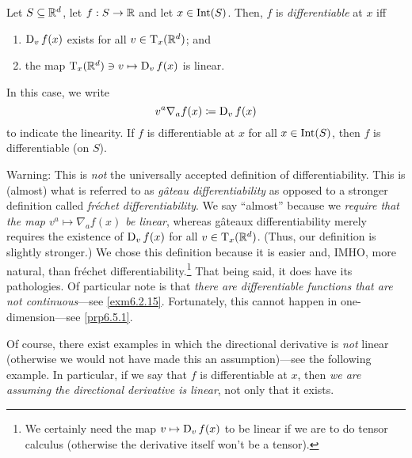 \begin{dfn}\label{Derivative}
\begin{savenotes}
Let $S\subseteq \R ^d$, let $f:S\rightarrow \R$ and let $x\in \Int (S)$.  Then, $f$ is \emph{differentiable} at $x$ iff
\begin{enumerate}
\item $\D _vf(x)$ exists for all $v\in \tangent{\R ^d}{x}$; and
\item the map $\tangent{\R ^d}{x}\ni v\mapsto \D _vf(x)$ is linear.
\end{enumerate}
In this case, we write
\begin{equation}
v^a\nabla _af(x)\coloneqq \D _vf(x)
\end{equation}
 to indicate the linearity.  If $f$ is differentiable at $x$ for all $x\in \Int (S)$, then $f$ is differentiable (on $S$).
\begin{rmk}
Warning:  This is \emph{not} the universally accepted definition of differentiability.  This is (almost) what is referred to as \emph{g\^{a}teau differentiability} as opposed to a stronger definition called \emph{fr\'{e}chet differentiability}.  We say ``almost'' because we \emph{require that the map $v^a\mapsto \nabla _af(x)$ be linear}, whereas g\^{a}teaux differentiability merely requires the existence of $\D _vf(x)$ for all $v\in \tangent{\R ^d}{x}$.  (Thus, our definition is slightly stronger.)  We chose this definition because it is easier and, IMHO, more natural, than fr\'{e}chet differentiability.\footnote{We certainly need the map $v\mapsto \D _vf(x)$ to be linear if we are to do tensor calculus (otherwise the derivative itself won't be a tensor).}  That being said, it does have its pathologies.  Of particular note is that \emph{there are differentiable functions that are not continuous}---see \cref{exm6.2.15}.  Fortunately, this cannot happen in one-dimension---see \cref{prp6.5.1}.
\end{rmk}
\begin{rmk}
Of course, there exist examples in which the directional derivative is \emph{not} linear (otherwise we would not have made this an assumption)---see the following example.  In particular, if we say that $f$ is differentiable at $x$, then \emph{we are assuming the directional derivative is linear}, not only that it exists.


\end{rmk}
\end{savenotes}
\end{dfn}
